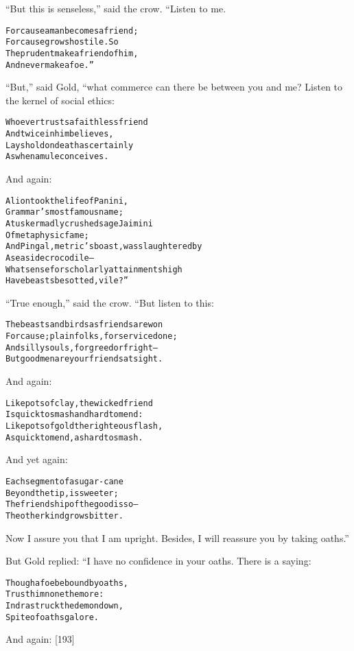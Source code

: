 \documentclass{article}
\renewenvironment{verbatim}{\begin{alltt}\normalfont\begin{centering}}{\end{centering}\end{alltt}}
\begin{document}
``But this is senseless,'' said the crow. “Listen to me.

\begin{verbatim}
For cause a man becomes a friend;
    For cause grows hostile. So
The prudent make a friend of him,
    And never make a foe.”
\end{verbatim}
``But,'' said Gold, “what commerce can there be between you and me?
Listen to the kernel of social ethics:

\begin{verbatim}
Whoever trusts a faithless friend
    And twice in him believes,
Lays hold on death as certainly
    As when a mule conceives.
\end{verbatim}
And again:

\begin{verbatim}
A lion took the life of Panini,
    Grammar's most famous name;
A tusker madly crushed sage Jaimini
    Of metaphysic fame;
And Pingal, metric's boast, was slaughtered by
    A seaside crocodile--
What sense for scholarly attainments high
    Have beasts besotted, vile?”
\end{verbatim}
``True enough,'' said the crow. “But listen to this:

\begin{verbatim}
The beasts and birds as friends are won
For cause; plain folks, for service done;
And silly souls, for greed or fright--
But good men are your friends at sight.
\end{verbatim}
And again:

\begin{verbatim}
Like pots of clay, the wicked friend
Is quick to smash and hard to mend:
Like pots of gold the righteous flash,
As quick to mend, as hard to smash.
\end{verbatim}
And yet again:

\begin{verbatim}
Each segment of a sugar-cane
    Beyond the tip, is sweeter;
The friendship of the good is so--
    The other kind grows bitter.
\end{verbatim}
Now I assure you that I am upright. Besides, I will reassure you by
taking oaths.”

But Gold replied: “I have no confidence in your oaths. There is a
saying:

\begin{verbatim}
Though a foe be bound by oaths,
    Trust him none the more:
Indra struck the demon down,
    Spite of oaths galore.
\end{verbatim}
And again: [193]
\end{document}

